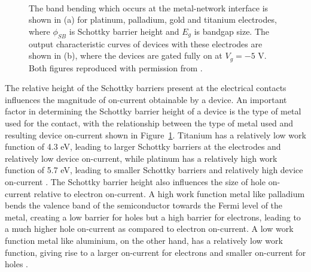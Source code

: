 \documentclass[
  a4paper,
]{scrbook}
\begin{document}
\begin{figure}
\begin{minipage}[t]{0.45\linewidth}
{{}

}

\end{minipage}%
%
\begin{minipage}[t]{0.01\linewidth}

{\centering 

~

}

\end{minipage}%

\caption{\label{fig-band-bending}The band bending which occurs at the
metal-network interface is shown in (a) for platinum, palladium, gold
and titanium electrodes, where \(\phi_{SB}\) is Schottky barrier height
and \(E_g\) is bandgap size. The output characteristic curves of devices
with these electrodes are shown in (b), where the devices are gated
fully on at \(V_g = -5\) V. Both figures reproduced with permission from
\autocite{Bargaoui2018}.}

\end{figure}

The relative height of the Schottky barriers present at the electrical
contacts influences the magnitude of on-current obtainable by a device.
An important factor in determining the Schottky barrier height of a
device is the type of metal used for the contact, with the relationship
between the type of metal used and resulting device on-current shown in
Figure~\ref{fig-band-bending}. Titanium has a relatively low work
function of 4.3 eV, leading to larger Schottky barriers at the
electrodes and relatively low device on-current, while platinum has a
relatively high work function of 5.7 eV, leading to smaller Schottky
barriers and relatively high device on-current \autocite{Bargaoui2018}.
The Schottky barrier height also influences the size of hole on-current
relative to electron on-current. A high work function metal like
palladium bends the valence band of the semiconductor towards the Fermi
level of the metal, creating a low barrier for holes but a high barrier
for electrons, leading to a much higher hole on-current as compared to
electron on-current. A low work function metal like aluminium, on the
other hand, has a relatively low work function, giving rise to a larger
on-current for electrons and smaller on-current for holes
\autocite{Chen2005,Avouris2007,Bargaoui2018}.
\end{document}
